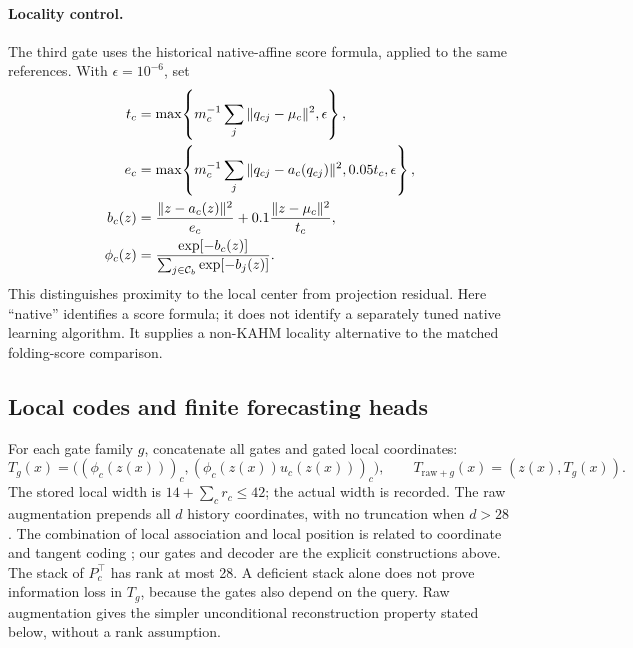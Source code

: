 \paragraph{Locality control.}
The third gate uses the historical native-affine score formula, applied to
the same references.  With $\epsilon=10^{-6}$, set
\begin{align}
 t_c&=\max\!\left\{m_c^{-1}\sum_j\|q_{cj}-\mu_c\|^2,\epsilon\right\},\notag\\
 e_c&=\max\!\left\{m_c^{-1}\sum_j\|q_{cj}-a_c(q_{cj})\|^2,
                    0.05t_c,\epsilon\right\},\notag\\
 b_c(z)&=\frac{\|z-a_c(z)\|^2}{e_c}
          +0.1\frac{\|z-\mu_c\|^2}{t_c},\notag\\
 \phi_c(z)&=\frac{\exp[-b_c(z)]}
                    {\sum_{j\in\mathcal C_b}\exp[-b_j(z)]}.
 \label{eq:nf-locality-gates}
\end{align}
This distinguishes proximity to the local center from projection residual.
Here ``native'' identifies a score formula; it does not identify a separately
tuned native learning algorithm.  It supplies a non-KAHM locality alternative
to the matched folding-score comparison.

\subsection{Local codes and finite forecasting heads}
\label{sec:nf-local-features}

For each gate family $g$, concatenate all gates and gated local coordinates:
\begin{equation}
 T_g(x)=\bigl((\phi_c(z(x)))_c,
                  (\phi_c(z(x))u_c(z(x)))_c\bigr),\qquad
 T_{\mathrm{raw}+g}(x)=(z(x),T_g(x)).
 \label{eq:nf-local-code}
\end{equation}
The stored local width is $14+\sum_c r_c\leq42$; the actual width is recorded.
The raw augmentation prepends all $d$ history coordinates, with no truncation
when $d>28$.  The combination of local association and local position is
related to coordinate and tangent coding \citep{Yu2009LCC,YuZhang2010LTC};
our gates and decoder are the explicit constructions above.
The stack of $P_c^\top$ has rank at most 28.  A deficient stack alone does
not prove information loss in $T_g$, because the gates also depend on the
query.  Raw augmentation gives the simpler unconditional reconstruction
property stated below, without a rank assumption.

